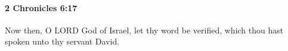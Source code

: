 
		\paragraph{2 Chronicles 6:17} %
			\label{2CHRONICLES-6-17}

			Now then, O LORD God of Israel, let thy word be verified, which thou hast spoken unto thy servant David.


